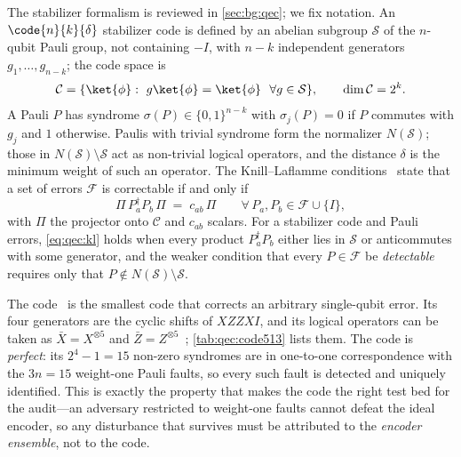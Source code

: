 The stabilizer formalism is reviewed in \cref{sec:bg:qec}; we fix notation. An $\code{n}{k}{\delta}$ stabilizer code is defined by an abelian subgroup $\mathcal{S}$ of the $n$-qubit Pauli group, not containing $-I$, with $n-k$ independent generators $g_1,\dots,g_{n-k}$; the code space is
\begin{equation}\label{eq:qec:codespace}
  \mathcal{C}=\{\ket{\phi}:\ g\ket{\phi}=\ket{\phi}\ \ \forall g\in\mathcal{S}\},\qquad \dim\mathcal{C}=2^{k}.
\end{equation}
A Pauli $P$ has syndrome $\sigma(P)\in\{0,1\}^{n-k}$ with $\sigma_j(P)=0$ if $P$ commutes with $g_j$ and $1$ otherwise. Paulis with trivial syndrome form the normalizer $N(\mathcal{S})$; those in $N(\mathcal{S})\setminus\mathcal{S}$ act as non-trivial logical operators, and the distance $\delta$ is the minimum weight of such an operator. The Knill--Laflamme conditions~\cite{knill1997theory} state that a set of errors $\mathcal{F}$ is correctable if and only if
\begin{equation}\label{eq:qec:kl}
  \Pi\,P_a^{\dagger}P_b\,\Pi \;=\; c_{ab}\,\Pi\qquad\forall\,P_a,P_b\in\mathcal{F}\cup\{I\},
\end{equation}
with $\Pi$ the projector onto $\mathcal{C}$ and $c_{ab}$ scalars. For a stabilizer code and Pauli errors, \cref{eq:qec:kl} holds when every product $P_a^{\dagger}P_b$ either lies in $\mathcal{S}$ or anticommutes with some generator, and the weaker condition that every $P\in\mathcal{F}$ be \emph{detectable} requires only that $P\notin N(\mathcal{S})\setminus\mathcal{S}$.

The  code~\cite{laflamme1996perfect,bennett1996mixed} is the smallest code that corrects an arbitrary single-qubit error. Its four generators are the cyclic shifts of $XZZXI$, and its logical operators can be taken as $\bar X=X^{\otimes 5}$ and $\bar Z=Z^{\otimes 5}$~\cite{nielsen2010qcqi}; \cref{tab:qec:code513} lists them. The code is \emph{perfect}: its $2^{4}-1=15$ non-zero syndromes are in one-to-one correspondence with the $3n=15$ weight-one Pauli faults, so every such fault is detected and uniquely identified. This is exactly the property that makes the code the right test bed for the audit---an adversary restricted to weight-one faults cannot defeat the ideal  encoder, so any disturbance that survives must be attributed to the \emph{encoder ensemble}, not to the code.

